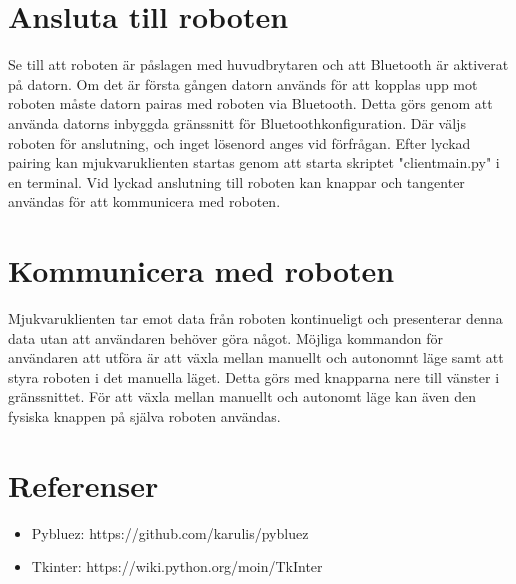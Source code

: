 \documentclass{article}
\begin{document}
\section{Ansluta till roboten}
Se till att roboten är påslagen med huvudbrytaren och att Bluetooth är aktiverat på datorn. Om det är första gången datorn används för att kopplas upp mot roboten måste datorn pairas med roboten via Bluetooth. Detta görs genom att använda datorns inbyggda gränssnitt för Bluetoothkonfiguration. Där väljs roboten för anslutning, och inget lösenord anges vid förfrågan. Efter lyckad pairing kan mjukvaruklienten startas genom att starta skriptet "client\textunderscore main.py" i en terminal. 
Vid lyckad anslutning till roboten kan knappar och tangenter användas för att kommunicera med roboten. 

\section{Kommunicera med roboten}
Mjukvaruklienten tar emot data från roboten kontinueligt och presenterar denna data utan att användaren behöver göra något.
Möjliga kommandon för användaren att utföra är att växla mellan manuellt och autonomnt läge samt att styra roboten i det manuella läget. Detta görs med knapparna nere till vänster i gränssnittet.
För att växla mellan manuellt och autonomt läge kan även den fysiska knappen på själva roboten användas. 

\section{Referenser}
\begin{itemize}
	\item Pybluez: https://github.com/karulis/pybluez
	\item Tkinter: https://wiki.python.org/moin/TkInter
\end{itemize}

\nocite{*}
{}

\end{document}

